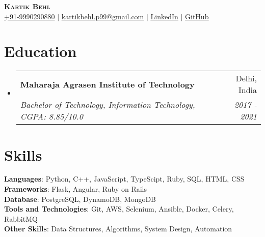 \documentclass[letterpaper,11pt]{article}
\makeatletter
\newcommand{\resumeItem}[1]{
  \item\small{
    {#1 \vspace{-2pt}}
  }
}
\newcommand{\resumeSubheading}[4]{
  \vspace{-2pt}\item
    \begin{tabular*}{0.97\textwidth}[t]{l@{\extracolsep{\fill}}r}
      \textbf{#1} & #2 \\
      \textit{\small#3} & \textit{\small #4} \\
    \end{tabular*}\vspace{-7pt}
}
\newcommand{\resumeSubHeadingListStart}{\begin{itemize}[leftmargin=0.15in, label={}]}
\newcommand{\resumeSubHeadingListEnd}{\end{itemize}}
\makeatother
\begin{document}

\begin{center}
    \textbf{\Huge \scshape Kartik Behl} \\ \vspace{1pt}
    \small \href{tel:9990290880}{+91-9990290880} $|$ \href{mailto:kartikbehl.p99@gmail.com}{\underline{kartikbehl.p99@gmail.com}} $|$ 
    \href{https://www.linkedin.com/in/kartik-b-b46a3484/}{\underline{LinkedIn}} $|$
    \href{https://github.com/kartikbehl99}{\underline{GitHub}}
\end{center}




\section{Education}
  \resumeSubHeadingListStart
    \resumeSubheading
      {Maharaja Agrasen Institute of Technology}{Delhi, India}
      {Bachelor of Technology, Information Technology, CGPA: 8.85/10.0}{2017 - 2021}
  \resumeSubHeadingListEnd


\section{Skills}
 \begin{itemize}[leftmargin=0.15in, label={}]
    \small{\item{
     \textbf{Languages}{: Python, C++, JavaScript, TypeScipt, Ruby, SQL, HTML, CSS} \\
     \textbf{Frameworks}{: Flask, Angular, Ruby on Rails} \\
     \textbf{Database}{: PostgreSQL, DynamoDB, MongoDB} \\
     \textbf{Tools and Technologies}{: Git, AWS, Selenium, Ansible, Docker, Celery, RabbitMQ} \\
     \textbf{Other Skills}{: Data Structures, Algorithms, System Design, Automation} \\
    }}
 \end{itemize}
\end{document}

